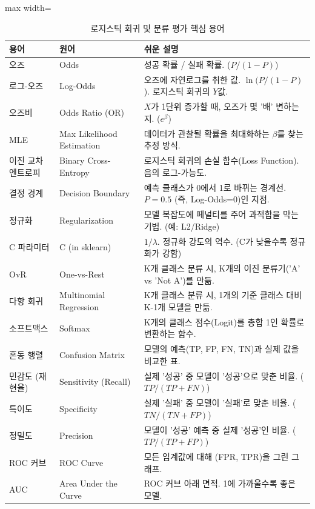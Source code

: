\documentclass[11pt,a4paper]{book}
\theoremstyle{definition}
\begin{document}
\begin{table}[h]
\caption{로지스틱 회귀 및 분류 평가 핵심 용어}
\label{tab:glossary}
\begin{adjustbox}{max width=\textwidth}
\begin{tabular}{@{}lll@{}}
\toprule
\textbf{용어} & \textbf{원어} & \textbf{쉬운 설명} \\ \midrule
오즈 & Odds & 성공 확률 / 실패 확률. ($P/(1-P)$) \\
로그-오즈 & Log-Odds & 오즈에 자연로그를 취한 값. $\ln(P/(1-P)$). 로지스틱 회귀의 $Y$값. \\
오즈비 & Odds Ratio (OR) & $X$가 1단위 증가할 때, 오즈가 몇 '배' 변하는지. ($e^\beta$) \\
MLE & Max Likelihood Estimation & 데이터가 관찰될 확률을 최대화하는 $\beta$를 찾는 추정 방식. \\
이진 교차 엔트로피 & Binary Cross-Entropy & 로지스틱 회귀의 손실 함수(Loss Function). 음의 로그-가능도. \\
결정 경계 & Decision Boundary & 예측 클래스가 0에서 1로 바뀌는 경계선. $P=0.5$ (즉, Log-Odds=0)인 지점. \\
정규화 & Regularization & 모델 복잡도에 페널티를 주어 과적합을 막는 기법. (예: L2/Ridge) \\
C 파라미터 & C (in sklearn) & $1/\lambda$. 정규화 강도의 역수. (C가 낮을수록 정규화가 강함) \\
OvR & One-vs-Rest & K개 클래스 분류 시, K개의 이진 분류기('A' vs 'Not A')를 만듦. \\
다항 회귀 & Multinomial Regression & K개 클래스 분류 시, 1개의 기준 클래스 대비 K-1개 모델을 만듦. \\
소프트맥스 & Softmax & K개의 클래스 점수(Logit)를 총합 1인 확률로 변환하는 함수. \\
혼동 행렬 & Confusion Matrix & 모델의 예측(TP, FP, FN, TN)과 실제 값을 비교한 표. \\
민감도 (재현율) & Sensitivity (Recall) & 실제 '성공' 중 모델이 '성공'으로 맞춘 비율. ($TP / (TP+FN)$) \\
특이도 & Specificity & 실제 '실패' 중 모델이 '실패'로 맞춘 비율. ($TN / (TN+FP)$) \\
정밀도 & Precision & 모델이 '성공' 예측 중 실제 '성공'인 비율. ($TP / (TP+FP)$) \\
ROC 커브 & ROC Curve & 모든 임계값에 대해 (FPR, TPR)을 그린 그래프. \\
AUC & Area Under the Curve & ROC 커브 아래 면적. 1에 가까울수록 좋은 모델. \\ \bottomrule
\end{tabular}
\end{adjustbox}
\end{table}
\end{document}
